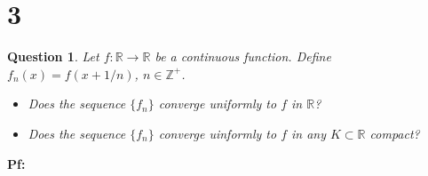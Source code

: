 \documentclass{article}
\newtheorem{question}{Question}
\begin{document}
\break

\section*{3}
\begin{myBox}[]{}
    \begin{question}
        Let $f:\mathbb{R}\rightarrow\mathbb{R}$ be a continuous function. Define $f_n(x)=f(x+1/n)$, $n\in\mathbb{Z}^+$.
        \begin{itemize}
            \item[(a)] Does the sequence $\{f_n\}$ converge uniformly to $f$ in $\mathbb{R}$?
            \item[(b)] Does the sequence $\{f_n\}$ converge uinformly to $f$ in any $K\subset \mathbb{R}$ compact? 
        \end{itemize}
    \end{question}
\end{myBox}

\textbf{Pf:}
\end{document}
